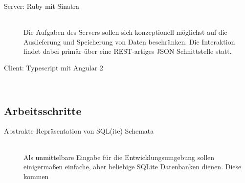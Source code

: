 \documentclass[paper=a4,fontsize=11pt,parskip=half]{scrartcl}
\begin{document}
\begin{description}
\item[Server: Ruby mit Sinatra] \hfill\\
  Die Aufgaben des Servers sollen sich konzeptionell möglichst auf die Auslieferung und Speicherung von Daten beschränken. Die Interaktion findet dabei primär über eine REST-artiges JSON Schnittstelle statt.
\item[Client: Typescript mit Angular 2] \hfill\\
  
\end{description}

\subsection{Arbeitsschritte}
\begin{description}
\item[Abstrakte Repräsentation von SQL(ite) Schemata] \hfill\\
  Als unmittelbare Eingabe für die Entwicklungsumgebung sollen einigermaßen einfache, aber beliebige SQLite Datenbanken dienen. Diese kommen
\end{description}

\listoftodos[Notes]

\begin{thebibliography}{9}


\end{thebibliography}
\end{document}
